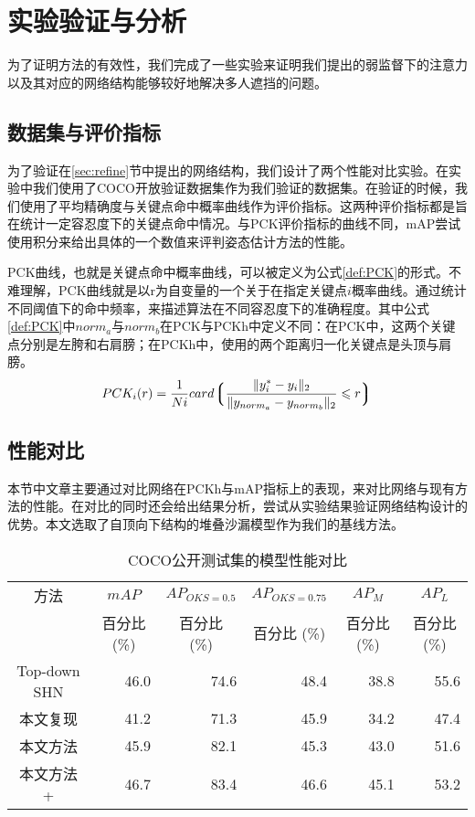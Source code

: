 \chapter{实验验证与分析}
\label{cha:exp}
为了证明方法的有效性，我们完成了一些实验来证明我们提出的弱监督下的注意力以及其对应的网络结构能够较好地解决多人遮挡的问题。
\section{数据集与评价指标}
\label{sec:dataset}
为了验证在\ref{sec:refine}节中提出的网络结构，我们设计了两个性能对比实验。在实验中我们使用了COCO开放验证数据集\cite{lin2014microsoft}作为我们验证的数据集。在验证的时候，我们使用了平均精确度与关键点命中概率曲线\cite{andriluka20142d}作为评价指标。这两种评价指标都是旨在统计一定容忍度下的关键点命中情况。与PCK评价指标的曲线不同，mAP尝试使用积分来给出具体的一个数值来评判姿态估计方法的性能。

PCK曲线，也就是关键点命中概率曲线，可以被定义为公式\eqref{def:PCK}的形式。不难理解，PCK曲线就是以r为自变量的一个关于在指定关键点$i$概率曲线。通过统计不同阈值下的命中频率，来描述算法在不同容忍度下的准确程度。其中公式\eqref{def:PCK}中$norm_a$与$norm_b$在PCK与PCKh中定义不同：在PCK中，这两个关键点分别是左胯和右肩膀；在PCKh中，使用的两个距离归一化关键点是头顶与肩膀。
\begin{equation}
\label{def:PCK}
PCK_i(r) = \frac{1}{Ni}card\big\lgroup\frac{\lVert y_i^* - y_i \rVert_2}{\lVert y_{norm_a} - y_{norm_b}\rVert_2} \le r \big\rgroup
\end{equation}


\section{性能对比}
\label{sec:perfcompare}
本节中文章主要通过对比网络在PCKh与mAP指标上的表现，来对比网络与现有方法的性能。在对比的同时还会给出结果分析，尝试从实验结果验证网络结构设计的优势。本文选取了自顶向下结构的堆叠沙漏模型作为我们的基线方法。
\begin{longtable}[c]{c*{5}{r}}
	\caption{COCO公开测试集的模型性能对比}
	\label{tab:mAPCOCObenchmark}\\
	\toprule[1.5pt]
	方法 & \multicolumn{1}{c}{$mAP$} & \multicolumn{1}{c}{$AP_{OKS=0.5}$} & \multicolumn{1}{c}{$AP_{OKS=0.75}$}
	& \multicolumn{1}{c}{$AP_M$} & \multicolumn{1}{c}{$AP_L$} \\
	
	& \multicolumn{1}{c}{百分比 (\%)}& \multicolumn{1}{c}{百分比 (\%)}&
	\multicolumn{1}{c}{百分比 (\%)}& \multicolumn{1}{c}{百分比 (\%)}& \multicolumn{1}{c}{
		百分比 (\%)}\\\midrule[1pt]
	\endhead
	\endlastfoot
	Top-down SHN\cite{newell2016stacked} & 46.0 & 74.6 & 48.4 & 38.8  & 55.6 \\
	本文复现 & 41.2 & 71.3 & 45.9 & 34.2 & 47.4 \\
	本文方法 & 45.9 & 82.1 & 45.3 & 43.0 & 51.6 \\
	本文方法+ & 46.7 & 83.4 & 46.6 & 45.1 & 53.2 \\
	\bottomrule[1.5pt]
\end{longtable}


